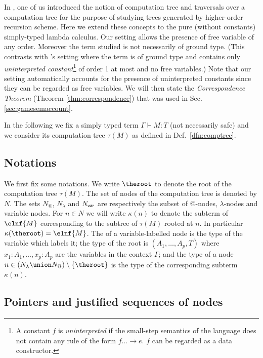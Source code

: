 In \cite{OngLics2006}, one of us introduced the notion of
computation tree and traversals over a computation tree for the
purpose of studying trees generated by higher-order recursion
scheme. Here we extend these concepts to the pure (\ie without
constants) simply-typed lambda calculus. Our setting allows the
presence of free variable of any order. Moreover the term studied is
not necessarily of ground type. (This contrasts with
\cite{OngLics2006}'s setting where the term is of ground type and
contains only \emph{uninterpreted constant}\footnote{A constant $f$
is  \emph{uninterpreted} if the small-step semantics of the language
  does not contain any rule of the form $f \dots \rightarrow e$. $f$
  can be regarded as a data constructor.} of order 1 at most and no
free variables.) Note that our setting automatically accounts for
the presence of uninterpreted constants since they can be regarded
as free variables. We will then state the \emph{Correspondence
Theorem} (Theorem \ref{thm:correspondence}) that was used in Sec.
\ref{sec:gamesemaccount}.

In the following we fix a simply typed term $\Gamma \vdash M :T$ (not necessarily safe) and we consider its computation tree $\tau(M)$ as defined in Def.\
\ref{dfn:comptree}.

\subsection{Notations}
We first fix some notations. We write $\theroot$ to denote the root
of the computation tree $\tau(M)$. The set of nodes of the
computation tree is denoted by $N$. The sets $N_@$, $N_\lambda$ and
$N_{\sf var}$ are respectively the subset of @-nodes,
$\lambda$-nodes and variable nodes. For $n \in N$ we will write
$\kappa(n)$ to denote the subterm of $\elnf{M}$ corresponding to the
subtree of $\tau(M)$ rooted at $n$. In particular $\kappa(\theroot)
= \elnf{M}$. The \defname{type} of a variable-labelled node is the
type of the variable which labels it; the type of the root is
$(A_1,\ldots,A_p, T)$ where $x_1:A_1,\ldots, x_p:A_p$ are the
variables in the context $\Gamma$; and the type of a node $n\in
(N_\lambda \union N_@) \setminus \{ \theroot \}$ is the type of the
corresponding subterm $\kappa(n)$.


\subsection{Pointers and justified sequences of nodes}

